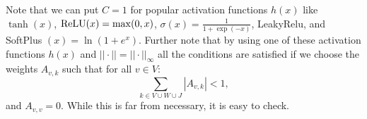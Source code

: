 \begin{Rem}
Note that we can put $C=1$ for popular activation functions $h(x)$ like $\tanh(x)$, $\mathrm{ReLU}(x)=\max(0,x)$, $\sigma(x)=\frac{1}{1+\exp(-x)}$, LeakyRelu, and SoftPlus $(x)=\ln(1+e^x)$.
Further note that by using one of these activation functions $h(x)$ and $||\cdot||=||\cdot||_\infty$ all the conditions are satisfied if we choose the weights $A_{v,k}$ such that for all $v \in V$:
$$\sum_{k \in V \cup W \cup J} |A_{v,k}| < 1,$$
and $A_{v,v} = 0$.
While this is far from necessary, it is easy to check.
\end{Rem}

